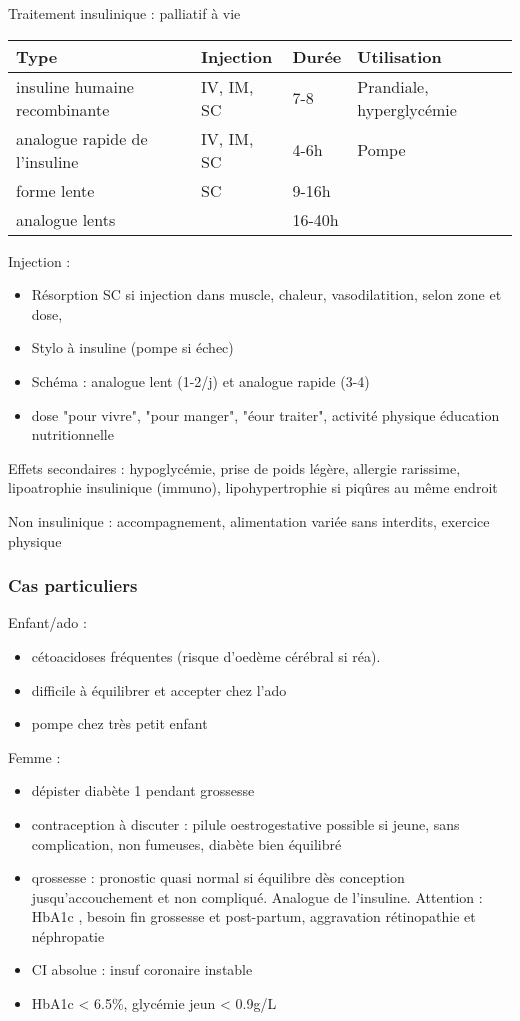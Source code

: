 \documentclass[11pt]{article}
\begin{document}
Traitement insulinique : palliatif à vie

\begin{center}
\begin{tabular}{llll}
\toprule
Type & Injection & Durée & Utilisation\\
\midrule
insuline humaine recombinante & IV, IM, SC & 7-8 & Prandiale, hyperglycémie\\
analogue rapide de l'insuline & IV, IM, SC & 4-6h & Pompe\\
forme lente & SC & 9-16h & \\
analogue lents &  & 16-40h & \\
\bottomrule
\end{tabular}
\end{center}

Injection :
\begin{itemize}
\item Résorption SC \inc si injection dans muscle, chaleur, vasodilatition, selon zone et dose,
\item Stylo à insuline (pompe si échec)
\item Schéma : analogue lent (1-2/j) et analogue rapide (3-4)
\item dose "pour vivre", "pour manger", "éour traiter", activité physique \thus
éducation nutritionnelle
\end{itemize}

Effets secondaires : hypoglycémie, prise de poids légère, allergie rarissime,
lipoatrophie insulinique (immuno), lipohypertrophie si piqûres au même endroit

Non insulinique : accompagnement, alimentation variée sans interdits, exercice physique

\subsubsection{Cas particuliers}
\label{sec:orge78a87a}
Enfant/ado : 
\begin{itemize}
\item cétoacidoses fréquentes (risque d'oedème cérébral \inc si réa).
\item difficile à équilibrer et accepter chez l'ado
\item pompe chez très petit enfant
\end{itemize}

Femme :
\begin{itemize}
\item dépister diabète 1 pendant grossesse
\item contraception à discuter : pilule oestrogestative possible si \female jeune,
sans complication, non fumeuses, diabète bien équilibré
\item qrossesse : pronostic quasi normal si équilibre dès conception
jusqu'accouchement et non compliqué. Analogue de l'insuline. Attention : HbA1c
\dec , \inc besoin fin grossesse et \dec post-partum, aggravation rétinopathie
et néphropatie
\item CI absolue : insuf coronaire instable
\item HbA1c < 6.5\%, glycémie jeun < 0.9g/L
\end{itemize}
\end{document}
